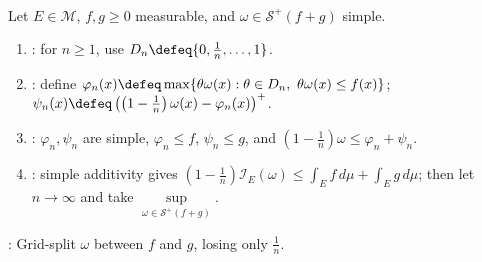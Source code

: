\begin{method} \label{meth:splitting-simple-minorants-under-sum} \\
Let $E\in\mathcal{M}$, $f,g\geq0$ measurable, and $\omega\in\mathcal{S}^+(f+g)$ simple.
\begin{enumerate}[label=(\roman*)]
\setlength{\itemsep}{0pt}
\item {}: for $n\geq1$, use $D_n\defeq\{0,\frac{1}{n},\ldots,1\}$.
\item {}: define $\varphi_n(x)\defeq\max\{\theta\omega(x):\theta\in D_n,\ \theta\omega(x)\leq f(x)\}$; $\psi_n(x)\defeq\left(\left(1-\frac{1}{n}\right)\omega(x)-\varphi_n(x)\right)^+$.
\item {}: $\varphi_n,\psi_n$ are simple, $\varphi_n\leq f$, $\psi_n\leq g$, and $(1-\frac{1}{n})\omega\leq\varphi_n+\psi_n$.
\item {}: simple additivity gives $(1-\frac{1}{n})\mathcal{I}_E(\omega)\leq\int_Ef\,d\mu+\int_Eg\,d\mu$; then let $n\to\infty$ and take $\sup\limits_{\omega\in\mathcal{S}^+(f+g)}$.
\end{enumerate}
: Grid-split $\omega$ between $f$ and $g$, losing only $\frac{1}{n}$.
\end{method}

